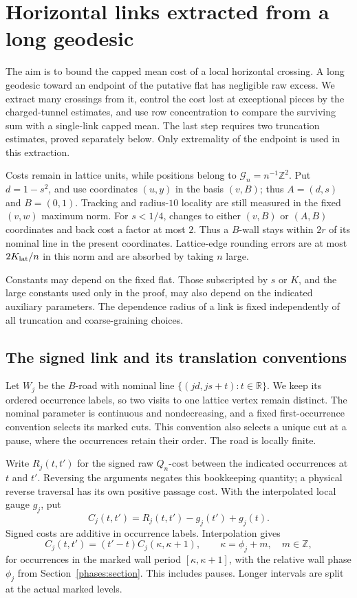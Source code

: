 \section{Horizontal links extracted from a long geodesic}
\label{links:section}

The aim is to bound the capped mean cost of a local horizontal crossing.
A long geodesic toward an endpoint of the putative flat has negligible
raw excess.  We extract many crossings from it, control the cost lost
at exceptional pieces by the charged-tunnel estimates, and use row
concentration to compare the surviving sum with a single-link capped mean.
The last step requires two truncation estimates, proved separately below.
Only extremality of the endpoint is used in this extraction.

Costs remain in lattice units, while positions belong to
$\mathcal G_n=n^{-1}\mathbb Z^2$.  Put $d=1-s^2$, and use coordinates $(u,y)$
in the basis $(v,B)$; thus $A=(d,s)$ and $B=(0,1)$.
Tracking and radius-$10$ locality are still measured in the fixed
$(v,w)$ maximum norm.  For $s<1/4$, changes to either
$(v,B)$ or $(A,B)$ coordinates and back cost a factor at most
$2$.  Thus a $B$-wall stays within $2r$ of its nominal line
in the present coordinates.  Lattice-edge rounding errors are at
most $2K_{\rm lat}/n$ in this norm and are absorbed by taking $n$ large.

Constants may depend on the fixed flat.  Those subscripted by
$s$ or $K$, and the large constants used only in the proof, may
also depend on the indicated auxiliary parameters.  The dependence
radius of a link is fixed independently of all truncation and
coarse-graining choices.

\subsection{The signed link and its translation conventions}

Let $W_j$ be the $B$-road with nominal line
$\{(jd,js+t):t\in\mathbb R\}$.  We keep its ordered occurrence
labels, so two visits to one lattice vertex remain distinct.
The nominal parameter is continuous and nondecreasing, and a fixed
first-occurrence convention selects its marked cuts.  This convention
also selects a unique cut at a pause, where the occurrences retain
their order.  The road is locally finite.

Write $R_j(t,t')$ for the signed raw $Q_n$-cost between the
indicated occurrences at $t$ and $t'$.  Reversing the arguments
negates this bookkeeping quantity; a physical reverse traversal has
its own positive passage cost.  With the interpolated local gauge
$g_j$, put
\[
 C_j(t,t')=R_j(t,t')-g_j(t')+g_j(t).
\]
Signed costs are additive in occurrence labels.  Interpolation gives
\[
 C_j(t,t')=(t'-t)C_j(\kappa,\kappa+1),
 \qquad \kappa=\phi_j+m,\quad m\in\mathbb Z,
\]
for occurrences in the marked wall period
$[\kappa,\kappa+1]$, with the relative wall phase $\phi_j$ from
Section~\ref{phases:section}.  This includes pauses.  Longer
intervals are split at the actual marked levels.

